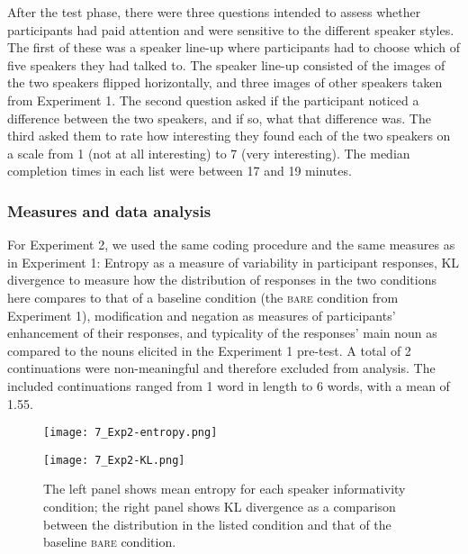 \documentclass[output=paper,colorlinks,citecolor=brown]{langscibook}
\begin{document}
After the test phase, there were three questions intended to assess whether participants had paid attention and were sensitive to the different speaker styles. The first of these was a speaker line-up where participants had to choose which of five speakers they had talked to. The speaker line-up consisted of the images of the two speakers flipped horizontally, and three images of other speakers taken from Experiment 1. The second question asked if the participant noticed a difference between the two speakers, and if so, what that difference was. The third asked them to rate how interesting they found each of the two speakers on a scale from 1 (not at all interesting) to 7 (very interesting). The median completion times in each list were between 17 and 19 minutes.

\subsubsection{Measures and data analysis}

For Experiment 2, we used the same coding procedure and the same measures as in Experiment 1: Entropy as a measure of variability in participant responses, KL divergence to measure how the distribution of responses in the two conditions here compares to that of a baseline condition (the \textsc{bare} condition from Experiment 1), modification and negation as measures of participants’ enhancement of their responses, and typicality of the responses’ main noun as compared to the nouns elicited in the Experiment 1 pre-test. A total of 2 continuations were non-meaningful and therefore excluded from analysis. The included continuations ranged from 1 word in length to 6 words, with a mean of 1.55.

\begin{figure}
    \centering
    \begin{minipage}{0.5\textwidth}
        \centering
        \texttt{[image: 7\_Exp2-entropy.png]} %
        \label{Exp2Entropy}
    \end{minipage}\hfill
    \begin{minipage}{0.5\textwidth}
        \centering
        \texttt{[image: 7\_Exp2-KL.png]} %
        \caption{The left panel shows mean entropy for each speaker informativity condition; the right panel shows KL divergence as a comparison between the distribution in the listed condition and that of the baseline \textsc{bare} condition.}
        \label{Exp2KL}
    \end{minipage}
\end{figure}
\end{document}
